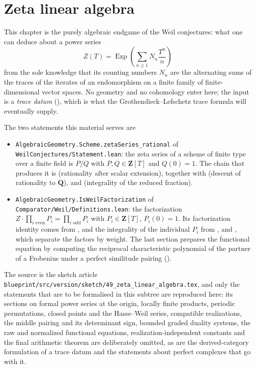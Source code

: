 
\chapter{Zeta linear algebra}\label{chap:zla}

This chapter is the purely algebraic endgame of the Weil conjectures: what one
can deduce about a power series
\[
  Z(T)=\operatorname{Exp}\left(\sum_{n\geq1}N_n\frac{T^n}{n}\right)
\]
from the sole knowledge that its counting numbers $N_n$ are the alternating
sums of the traces of the iterates of an endomorphism on a finite family of
finite-dimensional vector spaces.  No geometry and no cohomology enter here; the
input is a \emph{trace datum} (), which is what the
Grothendieck--Lefschetz trace formula will eventually supply.

The two statements this material serves are
\begin{itemize}
\item \texttt{AlgebraicGeometry.Scheme.zetaSeries\_rational} of
      \texttt{WeilConjectures/Statement.lean}: the zeta series of a scheme of
      finite type over a finite field is $P/Q$ with $P,Q\in\mathbf Z[T]$ and
      $Q(0)=1$.  The chain that produces it is
       (rationality after scalar
      extension),  together with
       (descent of rationality to
      $\mathbf Q$), and  (integrality of the
      reduced fraction).
\item \texttt{AlgebraicGeometry.IsWeilFactorization} of
      \texttt{Comparator/Weil/Definitions.lean}: the factorization
      $Z\cdot\prod_{i\text{ even}}P_i=\prod_{i\text{ odd}}P_i$ with
      $P_i\in\mathbf Z[T]$, $P_i(0)=1$.  Its factorization identity comes from
      , and the integrality of the
      individual $P_i$ from
      ,
       and
      , which separate the factors by
      weight.  The last section prepares the functional equation by computing
      the reciprocal characteristic polynomial of the partner of a Frobenius
      under a perfect similitude pairing
      ().
\end{itemize}

The source is the sketch article
\texttt{blueprint/src/version/sketch/49\_zeta\_linear\_algebra.tex}, and only
the statements that are to be formalised in this subtree are reproduced here:
its sections on formal power series at the origin, locally finite products,
periodic permutations, closed points and the Hasse--Weil series, compatible
realizations, the middle pairing and its determinant sign, bounded graded
duality systems, the raw and normalized functional equations,
realization-independent constants and the final arithmetic theorem are
deliberately omitted, as are the derived-category formulation of a trace datum
and the statements about perfect complexes that go with it.


